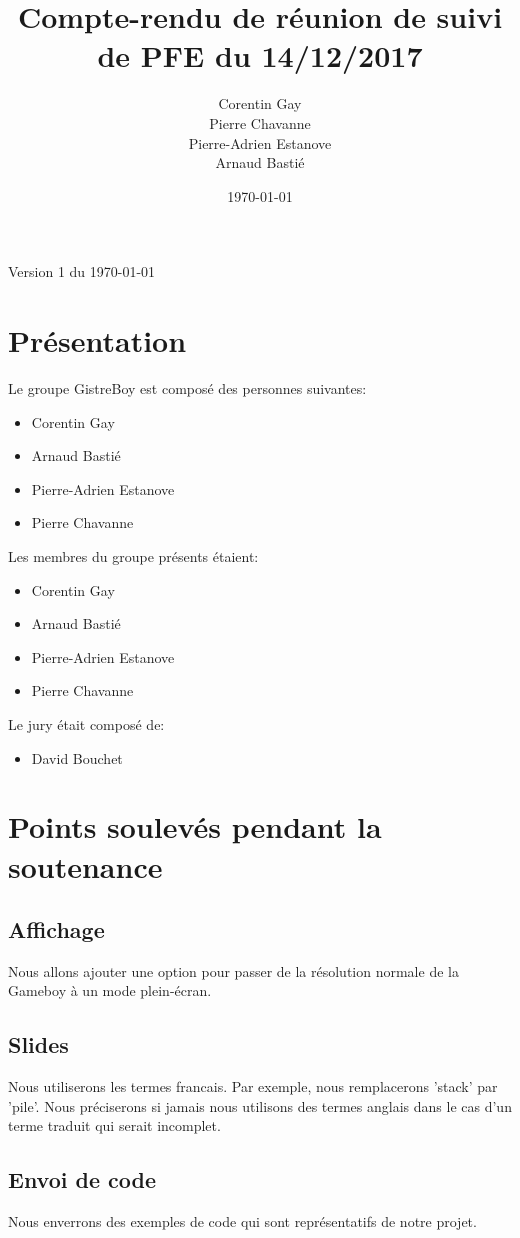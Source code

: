 \documentclass{article}
\author{Corentin Gay\\Pierre Chavanne\\Pierre-Adrien Estanove\\Arnaud
Basti\'e}
\date{\today}
\title{Compte-rendu de r\'eunion de suivi de PFE du 14/12/2017}
\begin{document}
\maketitle

Version 1 du \today
\section{Pr\'esentation}
Le groupe GistreBoy est compos\'e des personnes suivantes:
\begin{itemize}
	\item Corentin Gay
	\item Arnaud Basti\'e
	\item Pierre-Adrien Estanove
	\item Pierre Chavanne
\end{itemize}


Les membres du groupe pr\'esents \'etaient:
\begin{itemize}
	\item Corentin Gay
	\item Arnaud Basti\'e
	\item Pierre-Adrien Estanove
	\item Pierre Chavanne
\end{itemize}


Le jury \'etait compos\'e de:
\begin{itemize}
	\item David Bouchet
\end{itemize}
\section{Points soulev\'es pendant la soutenance}

\subsection{Affichage}
Nous allons ajouter une option pour passer de la r\'esolution normale de la
Gameboy \`a un mode plein-\'ecran.

\subsection{Slides}
Nous utiliserons les termes francais. Par
exemple, nous remplacerons 'stack' par 'pile'. Nous pr\'eciserons si jamais
nous utilisons des termes anglais dans le cas d'un terme traduit qui serait
incomplet.

\subsection{Envoi de code}
Nous enverrons des exemples de code qui sont
repr\'esentatifs de notre projet.
\end{document}
